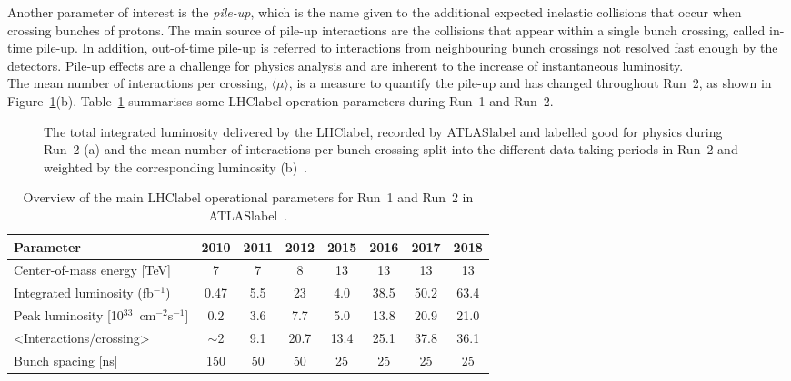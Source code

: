 Another parameter of interest is the \textit{pile-up}, which is the name given to the additional expected inelastic collisions that occur when crossing bunches of protons. The main source of pile-up interactions are the collisions that appear within a single bunch crossing, called in-time pile-up. In addition, out-of-time pile-up is referred to interactions from neighbouring bunch crossings not resolved fast enough by the detectors. Pile-up effects are a challenge for physics analysis and are inherent to the increase of instantaneous luminosity.\\ %

The mean number of interactions per crossing, $\langle\mu\rangle$, is a measure to quantify the pile-up and has changed throughout Run~2, as shown in Figure~\ref{figLHC:lumipileup}(b). Table~\ref{tabLHC:LHCparameters} summarises some \acrshort{LHClabel} operation parameters during Run~1 and Run~2.

\begin{figure}[htbp]
    \RawFloats
    \begin{center}
    \quad
    \caption{
        The total integrated luminosity delivered by the \acrshort{LHClabel}, recorded by \acrshort{ATLASlabel} and labelled good for physics during Run~2 (a) and the mean number of interactions per bunch crossing split into the different data taking periods in Run~2 and weighted by the corresponding luminosity (b)~\cite{publiclumi}. 
    }
    \label{figLHC:lumipileup}
    \end{center}
\end{figure}

\begin{table}[htbp]
    \begin{tabular}{l|ccccccc}
    \toprule\toprule
    Parameter                                        & 2010    & 2011 & 2012 & 2015 & 2016 & 2017 & 2018 \\     \midrule
    Center-of-mass energy [TeV]                                  & 7       & 7    & 8    & 13   & 13   & 13   & 13   \\
    Integrated luminosity (fb$^{-1}$)      & 0.47    & 5.5  & 23   & 4.0  & 38.5 & 50.2 & 63.4 \\
    Peak luminosity [10$^{33}$~cm$^{-2}$s$^{-1}$]     & 0.2     & 3.6  & 7.7  & 5.0  & 13.8 & 20.9 & 21.0 \\
    <Interactions/crossing>                        & $\sim$2 & 9.1  & 20.7 & 13.4 & 25.1 & 37.8 & 36.1 \\
    Bunch spacing [ns]                               & 150     & 50   & 50   & 25   & 25   & 25   & 25   \\
    \bottomrule\bottomrule                               
    \end{tabular}
    \caption{Overview of the main \acrshort{LHClabel} operational parameters for Run~1 and Run~2 in \acrshort{ATLASlabel}~\cite{publiclumi,publiclumiRun1}.}
    \label{tabLHC:LHCparameters}
    \end{table}

